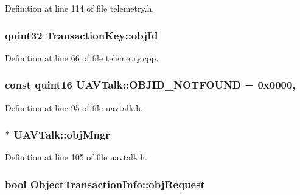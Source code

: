 Definition at line 114 of file telemetry.\-h.

\hypertarget{group___u_a_v_talk_plugin_ga23b79980c6f897e84ca1b88c5bb532ad}{
\subsubsection[{obj\-Id}]{\setlength{\rightskip}{0pt plus 5cm}quint32 Transaction\-Key\-::obj\-Id}}\label{group___u_a_v_talk_plugin_ga23b79980c6f897e84ca1b88c5bb532ad}


Definition at line 66 of file telemetry.\-cpp.

\hypertarget{group___u_a_v_talk_plugin_gaa627c86aec4d382c9744541688fb66ef}{
\subsubsection[{O\-B\-J\-I\-D\-\_\-\-N\-O\-T\-F\-O\-U\-N\-D}]{\setlength{\rightskip}{0pt plus 5cm}const quint16 U\-A\-V\-Talk\-::\-O\-B\-J\-I\-D\-\_\-\-N\-O\-T\-F\-O\-U\-N\-D = 0x0000\hspace{0.3cm}{\ttfamily [static]}, {\ttfamily [protected]}}}\label{group___u_a_v_talk_plugin_gaa627c86aec4d382c9744541688fb66ef}


Definition at line 95 of file uavtalk.\-h.

\hypertarget{group___u_a_v_talk_plugin_ga096422f1ff46ea45de07a92c41827aa5}{
\subsubsection[{obj\-Mngr}]{$\ast$ U\-A\-V\-Talk\-::obj\-Mngr\hspace{0.3cm}{\ttfamily [protected]}}}\label{group___u_a_v_talk_plugin_ga096422f1ff46ea45de07a92c41827aa5}


Definition at line 105 of file uavtalk.\-h.

\hypertarget{group___u_a_v_talk_plugin_ga35e10d2ea8bcd4f4bd1e32db43857e2c}{
\subsubsection[{obj\-Request}]{\setlength{\rightskip}{0pt plus 5cm}bool Object\-Transaction\-Info\-::obj\-Request}}\label{group___u_a_v_talk_plugin_ga35e10d2ea8bcd4f4bd1e32db43857e2c}


